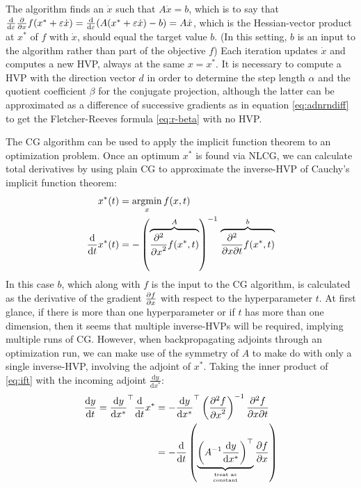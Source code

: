 \documentclass[11pt]{article}
\newcommand{\T}{\top}
\renewcommand{\(}{\left(}
\renewcommand{\)}{\right)}
\newcommand{\argmin}{\mathop{\mathrm{argmin}}}
\newcommand{\partby}[2]{{\partial #1\over \partial #2}}
\newcommand{\partbyby}[3]{{\partial^2 #1\over \partial #2 \partial #3}}
\newcommand{\partbyt}[2]{{\partial^2 #1\over {\partial #2}^2}}
\newcommand{\ud}{\mathrm{d}}
\newcommand{\dby}[2]{\frac{\ud #1}{\ud #2}}
\newcommand{\eps}{\varepsilon}
\begin{document}
\newcommand{\xdot}{\dot{x}}

The algorithm finds an $\xdot$ such that $A\xdot = b$, which is to say
that $\dby{}{\eps} \partby{}{x} f(x^* + \eps \xdot) =
\dby{}{\eps}(A(x^*+\eps \xdot)-b) = A\xdot$, which is the
Hessian-vector product at $x^*$ of $f$ with $\xdot$, should equal the
target value $b$. (In this setting, $b$ is an input to the algorithm
rather than part of the objective $f$) Each
iteration updates $\xdot$ and computes a new HVP, always at the same
$x=x^*$. It is necessary to compute a HVP with the direction
vector $d$ in order to determine the step length $\alpha$ and the
quotient coefficient $\beta$ for the conjugate projection, although
the latter can be approximated as a difference of successive gradients
as in equation \ref{eq:adnrndiff} to get the Fletcher-Reeves formula
\ref{eq:r-beta} with no HVP.

The CG algorithm can be used to apply the implicit function theorem to
an optimization problem. Once an optimum $x^*$ is found via NLCG, we
can calculate total derivatives by using plain CG to approximate the
inverse-HVP of Cauchy's implicit function theorem:
\begin{align}
  x^*(t) &=  \argmin_x f(x,t) \\
\dby{}{t}x^*(t) &= -\left(\stackrel{A}{\overbrace{\partbyt{}{x}f(x^*,t)}}\right)^{-1} \stackrel{b}{\overbrace{\partbyby{}{x}{t}f(x^*,t)}} \label{eq:ift}
\end{align}
In this case $b$, which along with $f$ is the input to the CG
algorithm, is calculated as the derivative of the gradient
$\partby{f}{x}$ with respect to the hyperparameter $t$. At first
glance, if there is more than one hyperparameter or if $t$ has more
than one dimension, then it seems that multiple inverse-HVPs will be
required, implying multiple runs of CG. However, when backpropagating
adjoints through an optimization run, we can make use of the symmetry
of $A$ to make do with only a single inverse-HVP, involving the
adjoint of $x^*$. Taking the inner product of \ref{eq:ift} with the
incoming adjoint $\dby{y}{x^*}$:
\begin{align}
  \dby{y}{t} = \dby{y}{x^*}^\T \dby{}{t}x^* &= -\dby{y}{x^*}^\T \left(\partbyt{f}{x} \right)^{-1} \partbyby{f}{x}{t} \\
  &= -\dby{}{t}\left(\underbrace{\left( A^{-1} \dby{y}{x^*} \right)^\T}_{{\textrm{\tiny treat as} \atop \textrm{\tiny constant}}}\partby{f}{x}\right)
\end{align}
\end{document}
